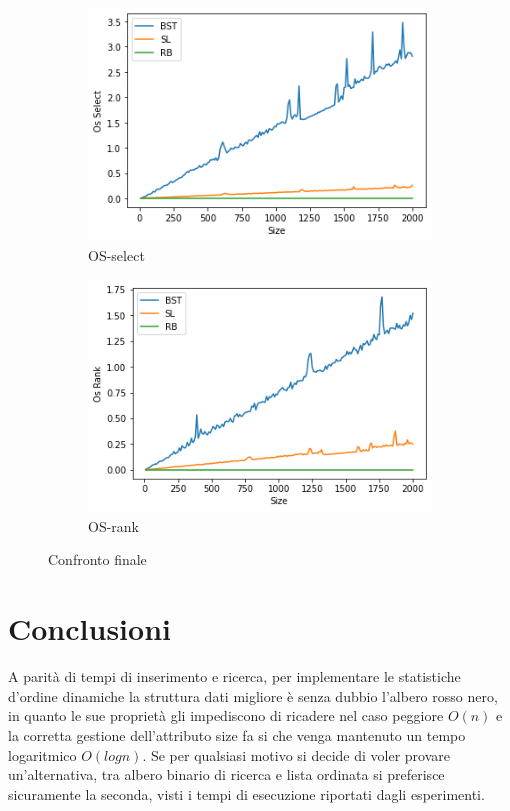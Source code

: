     \begin{figure}[h]
    \centering
    \begin{subfigure}[H]{0.4\textwidth}
        \centering
        \includegraphics[width=1\textwidth]{Images/CONFRONTO-SELECT.png}
        \caption{OS-select}
    \end{subfigure}
    \hfill
    \begin{subfigure}[H]{0.4\textwidth}
        \centering
        \includegraphics[width=1\textwidth]{Images/CONFRONTO-RANK.png}
        \caption{OS-rank}
    \end{subfigure}
    \caption{Confronto finale}
\end{figure}

\section{Conclusioni}

    A parità di tempi di inserimento e ricerca, per implementare le statistiche d'ordine dinamiche la struttura dati migliore è senza dubbio l'albero rosso nero, in quanto le sue proprietà gli impediscono di ricadere nel caso peggiore $O(n)$ e la corretta gestione dell'attributo size fa si che venga mantenuto un tempo logaritmico $O(logn)$. Se per qualsiasi motivo si decide di voler provare un'alternativa, tra albero binario di ricerca e lista ordinata si preferisce sicuramente la seconda, visti i tempi di esecuzione riportati dagli esperimenti.
